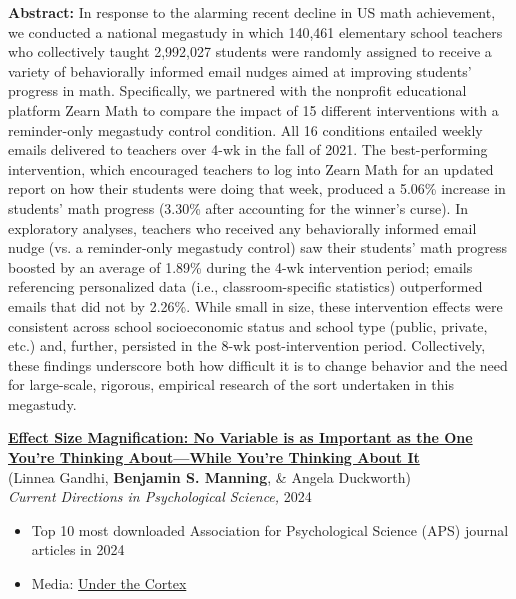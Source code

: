 \documentclass[margin,line,pifont,palatino,courier, 9pt]{res}
\begin{document}
\begin{resume}
\begin{singlespace}
\footnotesize
\textbf{Abstract:}
In response to the alarming recent decline in US math achievement, we conducted a national megastudy in which 140,461 elementary school teachers who collectively taught 2,992,027 students were randomly assigned to receive a variety of behaviorally informed email nudges aimed at improving students' progress in math. Specifically, we partnered with the nonprofit educational platform Zearn Math to compare the impact of 15 different interventions with a reminder-only megastudy control condition. All 16 conditions entailed weekly emails delivered to teachers over 4-wk in the fall of 2021. The best-performing intervention, which encouraged teachers to log into Zearn Math for an updated report on how their students were doing that week, produced a 5.06\% increase in students' math progress (3.30\% after accounting for the winner's curse). In exploratory analyses, teachers who received any behaviorally informed email nudge (vs. a reminder-only megastudy control) saw their students' math progress boosted by an average of 1.89\% during the 4-wk intervention period; emails referencing personalized data (i.e., classroom-specific statistics) outperformed emails that did not by 2.26\%. While small in size, these intervention effects were consistent across school socioeconomic status and school type (public, private, etc.) and, further, persisted in the 8-wk post-intervention period. Collectively, these findings underscore both how difficult it is to change behavior and the need for large-scale, rigorous, empirical research of the sort undertaken in this megastudy.
\end{singlespace}

\href{https://journals.sagepub.com/doi/full/10.1177/09637214241268222}{\bf Effect Size Magnification: No Variable is as Important as the One You're Thinking About---While You're Thinking About It}\\
(Linnea Gandhi\footnotemark[\value{footnote}], \textbf{Benjamin S. Manning}, \& Angela Duckworth)\\
\textit{Current Directions in Psychological Science,} 2024
\vspace{0.25cm}
\begin{itemize}
\item Top 10 most downloaded Association for Psychological Science (APS) journal articles in 2024
\item Media: \href{https://podcasts.apple.com/us/podcast/2024-in-review-10-most-popular-articles-from-aps-journals/id1533660085?i=1000683292869}{Under the Cortex}
\end{itemize}
\vspace{-0.25cm}


\end{resume}
\end{document}
